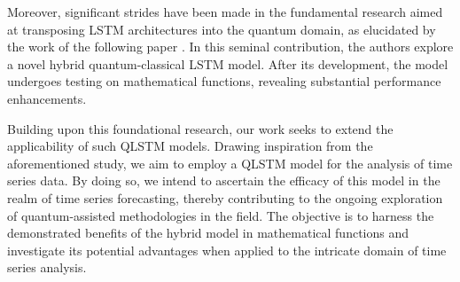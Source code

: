 Moreover, significant strides have been made in the fundamental research aimed at transposing LSTM architectures into the quantum domain, as elucidated by the work of the following paper \cite{chen2020quantum}. In this seminal contribution, the authors explore a novel hybrid quantum-classical LSTM model. After its development, the model undergoes  testing on mathematical functions, revealing substantial performance enhancements.

Building upon this foundational research, our work seeks to extend the applicability of such QLSTM models. Drawing inspiration from the aforementioned study, we aim to employ a QLSTM model for the analysis of time series data. By doing so, we intend to ascertain the efficacy of this model in the realm of time series forecasting, thereby contributing to the ongoing exploration of quantum-assisted methodologies in the field. The objective is to harness the demonstrated benefits of the hybrid model in mathematical functions and investigate its potential advantages when applied to the intricate domain of time series analysis.